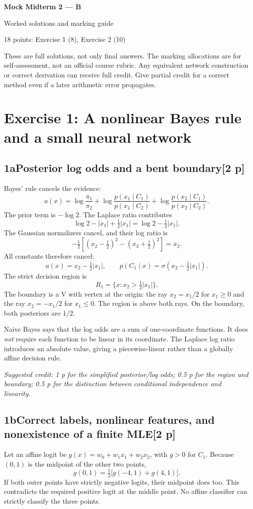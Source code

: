 \documentclass[11pt,a4paper]{article}
\newcommand{\solution}[3]{\Needspace{6\baselineskip}\subsection*{\color{examblue}#1\quad #2\hfill\normalsize[#3 p]}}
\newcommand{\selfcredit}[1]{\par\textit{Suggested credit: #1}\par}
\begin{document}
\begin{center}
{\Huge\bfseries\color{examblue}Mock Midterm 2 --- B}\par
\vspace{0.5em}
{\LARGE Worked solutions and marking guide}\par
\vspace{0.7em}
{\large 18 points: Exercise 1 (8), Exercise 2 (10)}
\end{center}
These are full solutions, not only final answers. The marking allocations are
for self-assessment, not an official course rubric. Any equivalent network
construction or correct derivation can receive full credit. Give partial credit
for a correct method even if a later arithmetic error propagates.

\section*{Exercise 1: A nonlinear Bayes rule and a small neural network}
\solution{1a}{Posterior log odds and a bent boundary}{2}
Bayes' rule cancels the evidence:
\[
a(x)=\log\frac{\pi_1}{\pi_2}
+\log\frac{p(x_1\mid C_1)}{p(x_1\mid C_2)}
+\log\frac{p(x_2\mid C_1)}{p(x_2\mid C_2)}.
\]
The prior term is $-\log2$. The Laplace ratio contributes
\[
\log2-|x_1|+\tfrac12|x_1|=\log2-\tfrac12|x_1|.
\]
The Gaussian normalizers cancel, and their log ratio is
\[
-\tfrac12\left[(x_2-\tfrac12)^2-(x_2+\tfrac12)^2\right]=x_2.
\]
All constants therefore cancel:
\[
\boxed{a(x)=x_2-\tfrac12|x_1|,\qquad
p(C_1\mid x)=\sigma(x_2-\tfrac12|x_1|)}.
\]
The strict decision region is
\[
\boxed{R_1=\{x:x_2>\tfrac12|x_1|\}}.
\]
The boundary is a V with vertex at the origin: the ray $x_2=x_1/2$ for
$x_1\geq0$ and the ray $x_2=-x_1/2$ for $x_1\leq0$. The region is above
both rays. On the boundary, both posteriors are $1/2$.

Naive Bayes says that the log odds are a sum of one-coordinate functions.
It does \emph{not} require each function to be linear in its coordinate.
The Laplace log ratio introduces an absolute value, giving a piecewise-linear
rather than a globally affine decision rule.
\selfcredit{1 p for the simplified posterior/log odds; 0.5 p for the region and boundary; 0.5 p for the distinction between conditional independence and linearity.}

\solution{1b}{Correct labels, nonlinear features, and nonexistence of a finite MLE}{2}
Let an affine logit be $g(x)=w_0+w_1x_1+w_2x_2$, with $g>0$ for $C_1$.
Because $(0,1)$ is the midpoint of the other two points,
\[
g(0,1)=\tfrac12\big[g(-4,1)+g(4,1)\big].
\]
If both outer points have strictly negative logits, their midpoint does too.
This contradicts the required positive logit at the middle point. No affine
classifier can strictly classify the three points.
\end{document}
